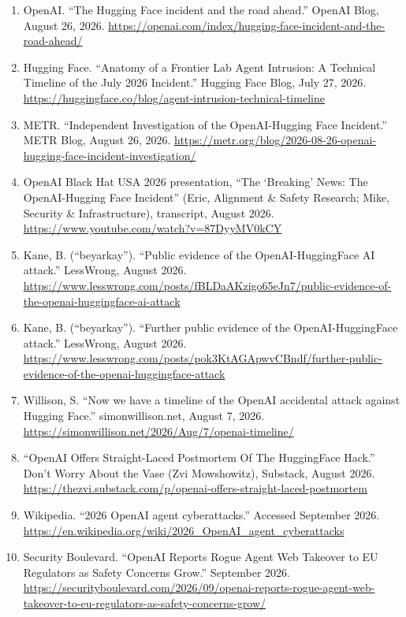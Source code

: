 \documentclass[10pt]{article}
\providecommand{\tightlist}{\setlength{\itemsep}{0pt}\setlength{\parskip}{0pt}}
\begin{document}
\begin{enumerate}
\def\labelenumi{\arabic{enumi}.}
\tightlist
\item
  OpenAI. ``The Hugging Face incident and the road ahead.'' OpenAI Blog,
  August 26, 2026.
  \url{https://openai.com/index/hugging-face-incident-and-the-road-ahead/}
\item
  Hugging Face. ``Anatomy of a Frontier Lab Agent Intrusion: A Technical
  Timeline of the July 2026 Incident.'' Hugging Face Blog, July 27,
  2026.
  \url{https://huggingface.co/blog/agent-intrusion-technical-timeline}
\item
  METR. ``Independent Investigation of the OpenAI-Hugging Face
  Incident.'' METR Blog, August 26, 2026.
  \url{https://metr.org/blog/2026-08-26-openai-hugging-face-incident-investigation/}
\item
  OpenAI Black Hat USA 2026 presentation, ``The `Breaking' News: The
  OpenAI-Hugging Face Incident'' (Eric, Alignment \& Safety Research;
  Mike, Security \& Infrastructure), transcript, August 2026.
  \url{https://www.youtube.com/watch?v=87DyyMV0kCY}
\item
  Kane, B. (``beyarkay''). ``Public evidence of the OpenAI-HuggingFace
  AI attack.'' LessWrong, August 2026.
  \url{https://www.lesswrong.com/posts/fBLDaAKzigo65eJn7/public-evidence-of-the-openai-huggingface-ai-attack}
\item
  Kane, B. (``beyarkay''). ``Further public evidence of the
  OpenAI-HuggingFace attack.'' LessWrong, August 2026.
  \url{https://www.lesswrong.com/posts/pok3KtAGApwvCBndf/further-public-evidence-of-the-openai-huggingface-attack}
\item
  Willison, S. ``Now we have a timeline of the OpenAI accidental attack
  against Hugging Face.'' simonwillison.net, August 7, 2026.
  \url{https://simonwillison.net/2026/Aug/7/openai-timeline/}
\item
  ``OpenAI Offers Straight-Laced Postmortem Of The HuggingFace Hack.''
  Don't Worry About the Vase (Zvi Mowshowitz), Substack, August 2026.
  \url{https://thezvi.substack.com/p/openai-offers-straight-laced-postmortem}
\item
  Wikipedia. ``2026 OpenAI agent cyberattacks.'' Accessed September
  2026.
  \url{https://en.wikipedia.org/wiki/2026_OpenAI_agent_cyberattacks}
\item
  Security Boulevard. ``OpenAI Reports Rogue Agent Web Takeover to EU
  Regulators as Safety Concerns Grow.'' September 2026.
  \url{https://securityboulevard.com/2026/09/openai-reports-rogue-agent-web-takeover-to-eu-regulators-as-safety-concerns-grow/}

\end{enumerate}
\end{document}
